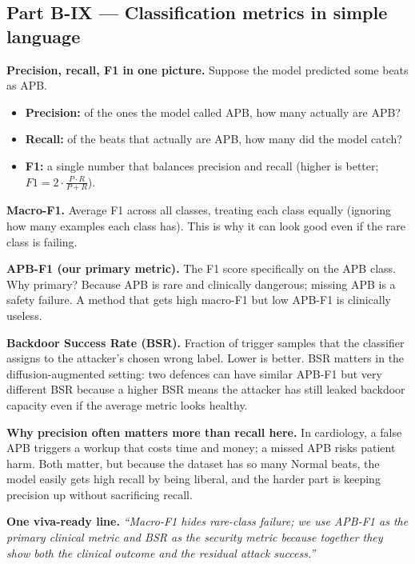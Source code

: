 \documentclass[11pt,a4paper]{article}
\begin{document}
\subsection{Part B-IX --- Classification metrics in simple language}
\label{sec:metrics-conceptual}

\textbf{Precision, recall, F1 in one picture.}
Suppose the model predicted some beats as APB.
\begin{itemize}
\item \textbf{Precision:} of the ones the model called APB, how many actually are APB?
\item \textbf{Recall:} of the beats that actually are APB, how many did the model catch?
\item \textbf{F1:} a single number that balances precision and recall (higher is better; $F1 = 2 \cdot \frac{P \cdot R}{P + R}$).
\end{itemize}

\textbf{Macro-F1.}
Average F1 across all classes, treating each class equally (ignoring how many
examples each class has). This is why it can look good even if the rare class
is failing.

\textbf{APB-F1 (our primary metric).}
The F1 score specifically on the APB class. Why primary? Because APB is rare
and clinically dangerous; missing APB is a safety failure. A method that gets
high macro-F1 but low APB-F1 is clinically useless.

\textbf{Backdoor Success Rate (BSR).}
Fraction of trigger samples that the classifier assigns to the attacker's
chosen wrong label. Lower is better. BSR matters in the diffusion-augmented
setting: two defences can have similar APB-F1 but very different BSR because
a higher BSR means the attacker has still leaked backdoor capacity even if the
average metric looks healthy.

\textbf{Why precision often matters more than recall here.}
In cardiology, a false APB triggers a workup that costs time and money; a
missed APB risks patient harm. Both matter, but because the dataset has so
many Normal beats, the model easily gets high recall by being liberal, and the
harder part is keeping precision up without sacrificing recall.

\textbf{One viva-ready line.}
\textit{``Macro-F1 hides rare-class failure; we use APB-F1 as the primary
clinical metric and BSR as the security metric because together they show both
the clinical outcome and the residual attack success.''}
\end{document}
